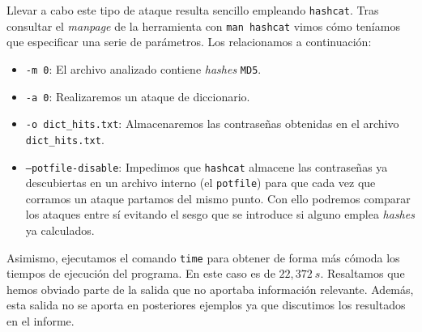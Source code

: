 \documentclass{article}
\begin{document}
            Llevar a cabo este tipo de ataque resulta sencillo empleando \texttt{hashcat}. Tras consultar el \textit{manpage} de la herramienta con \texttt{man hashcat} vimos cómo teníamos que especificar una serie de parámetros. Los relacionamos a continuación:

            \begin{itemize}
                \item \texttt{-m 0}: El archivo analizado contiene \textit{hashes} \texttt{MD5}.
                \item \texttt{-a 0}: Realizaremos un ataque de diccionario.
                \item \texttt{-o dict\_hits.txt}: Almacenaremos las contraseñas obtenidas en el archivo \texttt{dict\_hits.txt}.
                \item \texttt{--potfile-disable}: Impedimos que \texttt{hashcat} almacene las contraseñas ya descubiertas en un archivo interno (el \texttt{potfile}) para que cada vez que corramos un ataque partamos del mismo punto. Con ello podremos comparar los ataques entre sí evitando el sesgo que se introduce si alguno emplea \textit{hashes} ya calculados.
            \end{itemize}

            Asimismo, ejecutamos el comando \texttt{time} para obtener de forma más cómoda los tiempos de ejecución del programa. En este caso es de $22,372\ s$. Resaltamos que hemos obviado parte de la salida que no aportaba información relevante. Además, esta salida no se aporta en posteriores ejemplos ya que discutimos los resultados en el informe.
\end{document}
